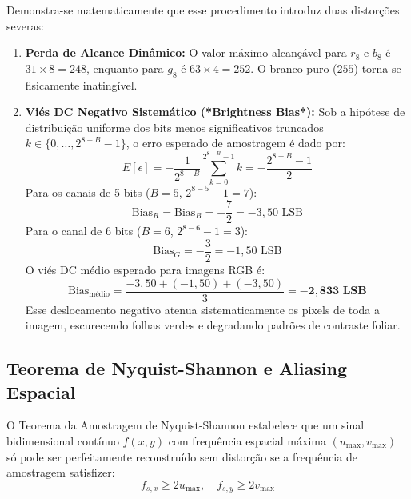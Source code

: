 Demonstra-se matematicamente que esse procedimento introduz duas distorções severas:
\begin{enumerate}
    \item \textbf{Perda de Alcance Dinâmico:} O valor máximo alcançável para $r_8$ e $b_8$ é $31 \times 8 = 248$, enquanto para $g_8$ é $63 \times 4 = 252$. O branco puro ($255$) torna-se fisicamente inatingível.
    \item \textbf{Viés DC Negativo Sistemático (*Brightness Bias*):} Sob a hipótese de distribuição uniforme dos bits menos significativos truncados $k \in \{0, \dots, 2^{8-B}-1\}$, o erro esperado de amostragem é dado por:
    \begin{equation}
    E[\epsilon] = -\frac{1}{2^{8-B}} \sum_{k=0}^{2^{8-B}-1} k = -\frac{2^{8-B}-1}{2}
    \label{eq:bias_teorico}
    \end{equation}
    Para os canais de 5 bits ($B=5$, $2^{8-5}-1 = 7$):
    \begin{equation}
    \text{Bias}_{R} = \text{Bias}_{B} = -\frac{7}{2} = -3,50\text{ LSB}
    \end{equation}
    Para o canal de 6 bits ($B=6$, $2^{8-6}-1 = 3$):
    \begin{equation}
    \text{Bias}_{G} = -\frac{3}{2} = -1,50\text{ LSB}
    \end{equation}
    O viés DC médio esperado para imagens RGB é:
    \begin{equation}
    \text{Bias}_{\text{médio}} = \frac{-3,50 + (-1,50) + (-3,50)}{3} = -\mathbf{2,833\text{ LSB}}
    \end{equation}
    Esse deslocamento negativo atenua sistematicamente os pixels de toda a imagem, escurecendo folhas verdes e degradando padrões de contraste foliar.
\end{enumerate}

\subsection{Teorema de Nyquist-Shannon e Aliasing Espacial}

O Teorema da Amostragem de Nyquist-Shannon \cite{nyquist1928certain, shannon1949communication} estabelece que um sinal bidimensional contínuo $f(x, y)$ com frequência espacial máxima $(u_{\max}, v_{\max})$ só pode ser perfeitamente reconstruído sem distorção se a frequência de amostragem satisfizer:
\begin{equation}
f_{s, x} \ge 2 u_{\max}, \quad f_{s, y} \ge 2 v_{\max}
\end{equation}

